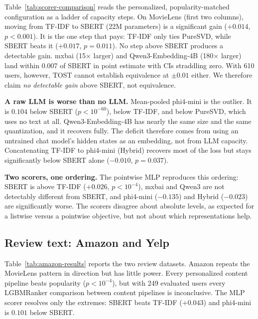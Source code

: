 Table~\ref{tab:scorer-comparison} reads the personalized,
popularity-matched configuration as a ladder of capacity steps. On
MovieLens (first two columns), moving
from TF-IDF to SBERT (22M parameters) is a significant gain
($+0.014$, $p<0.001$). It is the one step that pays: TF-IDF only ties
PureSVD, while SBERT beats it ($+0.017$, $p=0.011$). No step above SBERT
produces a detectable gain. mxbai (15$\times$ larger) and
Qwen3-Embedding-4B (180$\times$ larger) land within 0.007 of SBERT in
point estimate with CIs straddling zero. With 610 users, however, TOST
cannot establish equivalence at $\pm0.01$ either. We therefore claim
\emph{no detectable gain} above SBERT, not equivalence.

\textbf{A raw LLM is worse than no LLM.} Mean-pooled phi4-mini is the
outlier. It is $0.104$ below SBERT ($p<10^{-60}$), below TF-IDF, and
below PureSVD, which uses no text at all. Qwen3-Embedding-4B has
nearly the same size and the same quantization, and it recovers fully.
The deficit therefore comes from using an untrained chat model's hidden
states as an embedding, not from LLM capacity. Concatenating TF-IDF to
phi4-mini (Hybrid) recovers most of the loss but stays significantly
below SBERT alone ($-0.010$, $p=0.037$).

\textbf{Two scorers, one ordering.} The pointwise MLP reproduces this
ordering: SBERT is above TF-IDF ($+0.026$, $p<10^{-4}$), mxbai and
Qwen3 are not detectably different from SBERT, and phi4-mini ($-0.135$)
and Hybrid ($-0.023$) are significantly worse. The scorers disagree
about absolute levels, as expected for a listwise versus a pointwise
objective, but not about which representations help.

\subsection{Review text: Amazon and Yelp}
\label{sec:amazon-results}
\begin{table}[t]
\centering
\caption{Amazon Reviews and Yelp NDCG@10 (LGBMRanker, mean $\pm$ 95\% CI
over 5 seeds). ``Item only'' and ``+Aff.+Pop.'' use popularity-matched
negatives, as in Table~\ref{tab:main-results}; ``Uniform'' uses uniform
negatives.}
\label{tab:amazon-results}

\end{table}

Table~\ref{tab:amazon-results} reports the two review datasets. Amazon
repeats the MovieLens pattern in direction but has little power. Every
personalized content pipeline beats popularity ($p<10^{-4}$), but with
249 evaluated users every LGBMRanker comparison between content
pipelines is inconclusive. The MLP scorer resolves only the extremes:
SBERT beats TF-IDF ($+0.043$) and phi4-mini is $0.101$ below SBERT.

